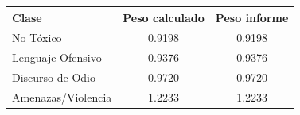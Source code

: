 \begin{tabular}{lcc}
\toprule
Clase & Peso calculado & Peso informe \\
\midrule
No Tóxico & 0.9198 & 0.9198 \\
Lenguaje Ofensivo & 0.9376 & 0.9376 \\
Discurso de Odio & 0.9720 & 0.9720 \\
Amenazas/Violencia & 1.2233 & 1.2233 \\
\bottomrule
\end{tabular}

